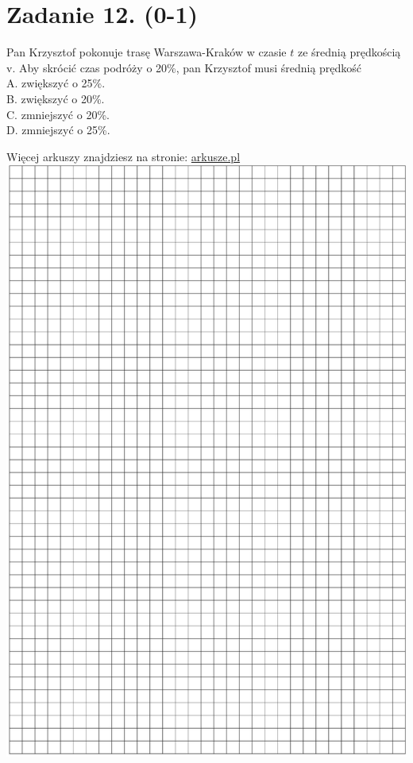 \documentclass[10pt]{article}
\begin{document}
\section*{Zadanie 12. (0-1)}
Pan Krzysztof pokonuje trasę Warszawa-Kraków w czasie \(t\) ze średnią prędkością v. Aby skrócić czas podróży o 20\%, pan Krzysztof musi średnią prędkość\\
A. zwiększyć o 25\%.\\
B. zwiększyć o 20\%.\\
C. zmniejszyć o 20\%.\\
D. zmniejszyć o 25\%.

Więcej arkuszy znajdziesz na stronie: \href{http://arkusze.pl}{arkusze.pl}\\
\includegraphics[max width=\textwidth, center]{2024_11_21_72158d4a4efa7dd894bcg-05}
\end{document}
